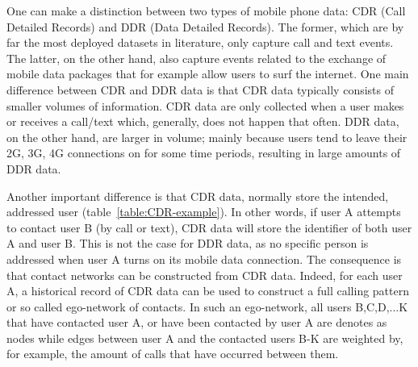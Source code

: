 \documentclass[a4paper]{article}
\begin{document}
One can make a distinction between two types of mobile phone data: CDR (Call Detailed Records) and DDR (Data Detailed Records). The former, which are by far the most deployed datasets in literature, only capture call and text events. The latter, on the other hand, also capture events related to the exchange of mobile data packages that for example allow users to surf the internet. One main difference between CDR and DDR data is that CDR data typically consists of smaller volumes of information. CDR data are only collected when a user makes or receives a call/text which, generally, does not happen that often. DDR data, on the other hand, are larger in volume; mainly because users tend to leave their 2G, 3G, 4G connections on for some time periods, resulting in large amounts of DDR data.

Another important difference is that CDR data, normally store the intended, addressed user (table~\ref{table:CDR-example}). In other words, if user A attempts to contact user B (by call or text), CDR data will store the identifier of both user A and user B. This is not the case for DDR data, as no specific person is addressed when user A turns on its mobile data connection. The consequence is that contact networks can be constructed from CDR data. Indeed, for each user A, a historical record of CDR data can be used to construct a full calling pattern or so called ego-network of contacts. In such an ego-network, all users B,C,D,...K that have contacted user A, or have been contacted by user A are denotes as nodes while edges between user A and the contacted users B-K are weighted by, for example, the amount of calls that have occurred between them. 
\end{document}
